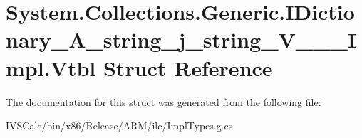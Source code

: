 \hypertarget{struct_system_1_1_collections_1_1_generic_1_1_i_dictionary___a__string__j__string___v_______impl_1_1_vtbl}{}\section{System.\+Collections.\+Generic.\+I\+Dictionary\+\_\+\+A\+\_\+string\+\_\+j\+\_\+string\+\_\+\+V\+\_\+\+\_\+\+\_\+\+Impl.\+Vtbl Struct Reference}
\label{struct_system_1_1_collections_1_1_generic_1_1_i_dictionary___a__string__j__string___v_______impl_1_1_vtbl}


The documentation for this struct was generated from the following file\+:\begin{DoxyCompactItemize}
\item 
I\+V\+S\+Calc/bin/x86/\+Release/\+A\+R\+M/ilc/Impl\+Types.\+g.\+cs\end{DoxyCompactItemize}
